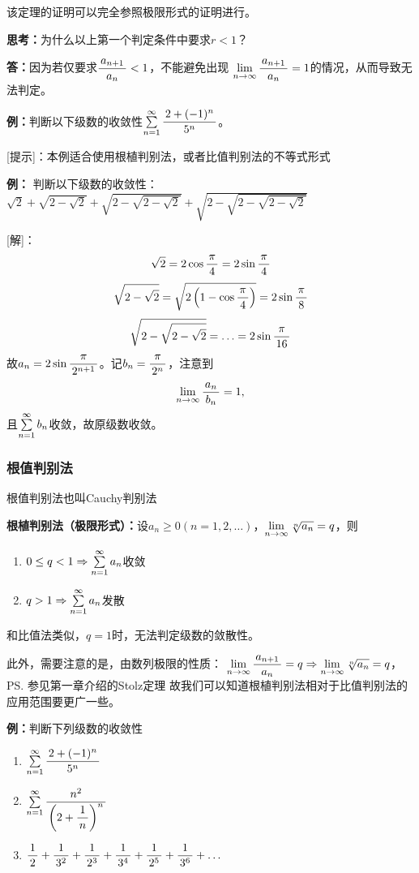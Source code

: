 该定理的证明可以完全参照极限形式的证明进行。

{\b {\bf 思考：}为什么以上第一个判定条件中要求$r<1$？

{\bf 答：}因为若仅要求$\df{a_{n+1}}{a_n}<1$，不能避免出现
$\limn\df{a_{n+1}}{a_n}=1$的情况，从而导致无法判定。}

{\bf 例：}判断以下级数的收敛性$\sumn\df{2+(-1)^n}{5^n}$。

[提示]：本例适合使用根植判别法，或者比值判别法的不等式形式

{\bf 例：} 判断以下级数的收敛性：$\sqrt2+\sqrt{2-\sqrt2}+\sqrt{2-\sqrt{2-\sqrt2}}
+\sqrt{2-\sqrt{2-\sqrt{2-\sqrt2}}}$

[解]：
$$\sqrt2=2\cos\df{\pi}4=2\sin\df{\pi}4$$
$$\sqrt{2-\sqrt2}=\sqrt{2\left(1-\cos\df{\pi}4\right)}=2\sin\df{\pi}8$$
$$\sqrt{2-\sqrt{2-\sqrt2}}=\ldots=2\sin\df{\pi}{16}$$
故$a_n=2\sin\df{\pi}{2^{n+1}}$。记$b_n=\df{\pi}{2^{n}}$，注意到
$$\limn\df{a_n}{b_n}=1,$$
且$\sumn b_n$收敛，故原级数收敛。\fin

\subsubsection{根值判别法}

根值判别法也叫{\kaishu Cauchy判别法}

\begin{thx}
	{\bf 根植判别法（极限形式）：}设$a_n\geq 0(n=1,2,\ldots)$，$\limn\sqrt[n]{a_n}=q$，则
	\begin{enumerate}
	  \item $0\leq q<1\Rightarrow\sumn a_n$收敛
	  \item $q>1\Rightarrow\sumn a_n$发散
	\end{enumerate}
\end{thx}

和比值法类似，$q=1$时，无法判定级数的敛散性。

此外，需要注意的是，由数列极限的性质：
$\limn\df{a_{n+1}}{a_n}=q\Rightarrow\limn\sqrt[n]{a_n}=q$，
\ps{参见第一章介绍的Stolz定理}
故我们可以知道根植判别法相对于比值判别法的应用范围要更广一些。


{\bf 例：}判断下列级数的收敛性
\begin{enumerate} [(1)]
  \setlength{\itemindent}{1cm}
  \item $\sumn\df{2+(-1)^n}{5^n}$
  \item $\sumn\df{n^2}{\left(2+\df 1n\right)^n}$
  \item $\df 12+\df 1{3^2}+\df 1{2^3}+\df 1{3^4}+\df 1{2^5}+\df 1{3^6}+\ldots$
\end{enumerate}

